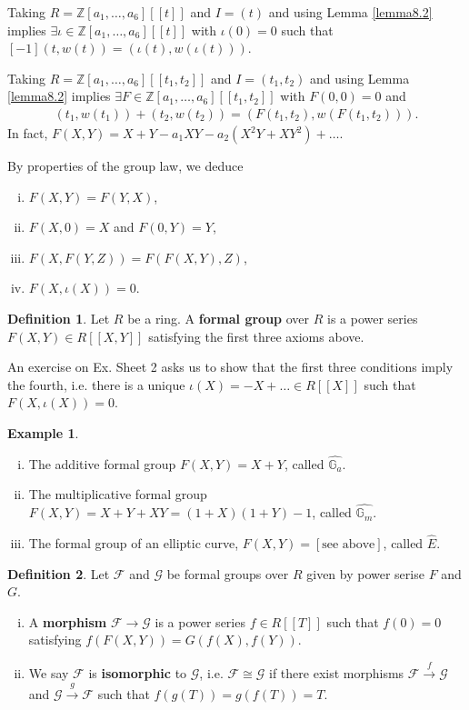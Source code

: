 \documentclass{article}
\theoremstyle{definition}
\newtheorem{example}{Example}[section]
\newtheorem{defn}{Definition}[section]
\begin{document}
Taking $R = \mathbb{Z}[a_1,\ldots,a_6][[t]]$ and $I = (t)$ and using Lemma \ref{lemma8.2} implies $\exists \iota \in \mathbb{Z}[a_1,\ldots,a_6][[t]]$ with $\iota(0)=0$ such that $[-1](t,w(t)) = (\iota(t), w(\iota(t)))$.
\vspace{1mm}
 
Taking $R = \mathbb{Z}[a_1,\ldots,a_6][[t_1,t_2]]$ and $I = (t_1,t_2)$ and using Lemma \ref{lemma8.2} implies $\exists F \in \mathbb{Z}[a_1,\ldots,a_6][[t_1,t_2]]$ with $F(0,0)=0$ and 
\begin{align*}
    (t_1,w(t_1)) + (t_2,w(t_2)) = (F(t_1,t_2), w(F(t_1,t_2))).
\end{align*}
In fact, $F(X,Y) = X + Y - a_1XY - a_2(X^2Y + XY^2) + \ldots$.
\vspace{1mm}
 
By properties of the group law, we deduce
\begin{enumerate}[(i)]
    \item $F(X,Y)=F(Y,X)$,
    \item $F(X,0)=X$ and $F(0,Y)=Y$,
    \item $F(X,F(Y,Z)) = F(F(X,Y),Z)$,
    \item $F(X,\iota(X))=0$.
\end{enumerate}
\begin{defn}\label{defn8.4}
    Let $R$ be a ring. A \textbf{formal group} over $R$ is a power series $F(X,Y) \in R[[X,Y]]$ satisfying the first three axioms above.
\end{defn}
An exercise on Ex. Sheet 2 asks us to show that the first three conditions imply the fourth, i.e. there is a unique $\iota(X) = -X + \ldots \in R[[X]]$ such that $F(X,\iota(X))=0$.
\begin{example}
    \begin{enumerate}[(i)]
        \item The additive formal group $F(X,Y)=X+Y$, called $\widehat{\mathbb{G}_a}$.
        \item The multiplicative formal group $F(X,Y) = X + Y +XY = (1+X)(1+Y)-1$, called $\widehat{\mathbb{G}_m}$.
        \item The formal group of an elliptic curve, $F(X,Y) = [\text{see above}]$, called $\widehat{E}$.
    \end{enumerate}
\end{example}
\begin{defn}
    Let $\mathcal{F}$ and $\mathcal{G}$ be formal groups over $R$ given by power serise $F$ and $G$.
    \begin{enumerate}[(i)]
        \item A \textbf{morphism} $\mathcal{F} \to \mathcal{G}$ is a power series $f \in R[[T]]$ such that $f(0)=0$ satisfying $f(F(X,Y))=G(f(X),f(Y))$.
        \item We say $\mathcal{F}$ is \textbf{isomorphic} to $\mathcal{G}$, i.e. $\mathcal{F}\cong \mathcal{G}$ if there exist morphisms $\mathcal{F} \stackrel{f}{\to} \mathcal{G}$ and $\mathcal{G} \stackrel{g}{\to} \mathcal{F}$ such that $f(g(T))=g(f(T))=T$.
    \end{enumerate}
\end{defn}
\end{document}
